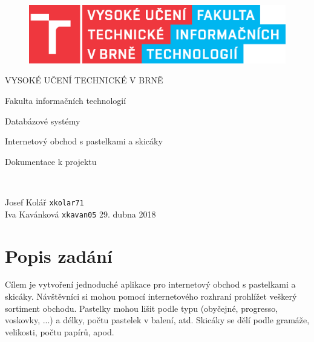 \documentclass[12pt,a4paper]{article}
\begin{document}
	
	\begin{titlepage}
	\begin{figure}
	\centering
 	\includegraphics[scale=1.0]{obr/logo.eps}
	\end{figure}
	{\centering
	\begin{LARGE}
 	VYSOKÉ UČENÍ TECHNICKÉ V BRNĚ
	\end{LARGE}

	\vspace{20pt}
	\begin{Large}
	Fakulta informačních technologií
	\end{Large}


	\vspace{200pt}

	\begin{Large}
		Databázové systémy
	\end{Large}

	\vspace{10pt}

 	\begin{Huge}
 	Internetový obchod s pastelkami a skicáky
	\end{Huge}
	
	\vspace{10pt}

	\begin{Large}
		Dokumentace k projektu
	\end{Large}
	\\
}
	\vfill
	
	Josef Kolář \texttt{xkolar71}\\ Iva Kavánková \texttt{xkavan05} \hfill 29. dubna 2018

	\end{titlepage}

 	\tableofcontents


	\newpage
 	
	
	\section{Popis zadání}
	Cílem je vytvoření jednoduché aplikace pro internetový obchod s pastelkami a skicáky. Návštěvníci si mohou pomocí internetového rozhraní prohlížet veškerý sortiment obchodu. Pastelky mohou lišit podle typu (obyčejné, progresso, voskovky, ...) a délky, počtu pastelek v balení, atd. Skicáky se dělí podle gramáže, velikosti, počtu papírů, apod.
\end{document}
